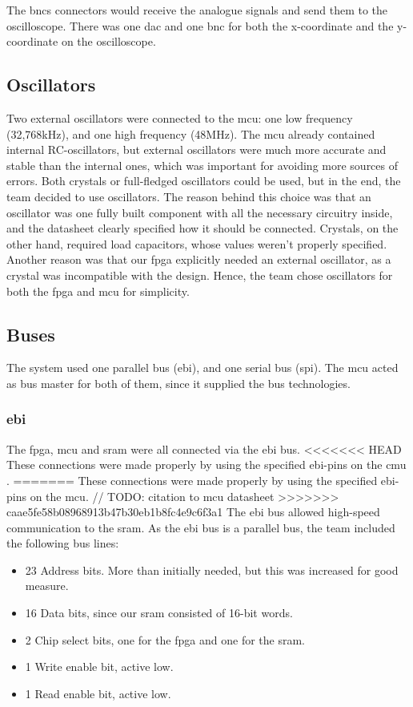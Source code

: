 The \gls{bnc}s connectors would receive the analogue signals and send them to the oscilloscope.
There was one \gls{dac} and one \gls{bnc} for both the x-coordinate and the y-coordinate on the oscilloscope.

\subsection{Oscillators}
Two external oscillators were connected to the \gls{mcu}: one low frequency (32,768kHz), and one high frequency (48MHz).
The \gls{mcu} already contained internal RC-oscillators, but external oscillators were much more accurate and stable than the internal ones, which was important for avoiding more sources of errors.
Both crystals or full-fledged oscillators could be used, but in the end, the team decided to use oscillators.
The reason behind this choice was that an oscillator was one fully built component with all the necessary circuitry inside, and the datasheet clearly specified how it should be connected.
Crystals, on the other hand, required load capacitors, whose values weren't properly specified.
Another reason was that our \gls{fpga} explicitly needed an external oscillator, as a crystal was incompatible with the design.
Hence, the team chose oscillators for both the \gls{fpga} and \gls{mcu} for simplicity.

\subsection{Buses}
The system used one parallel bus (\gls{ebi}), and one serial bus (\gls{spi}).
The \gls{mcu} acted as bus master for both of them, since it supplied the bus technologies.

\subsubsection{\gls{ebi}}
The \gls{fpga}, \gls{mcu} and \gls{sram} were all connected via the \gls{ebi} bus.
<<<<<<< HEAD
These connections were made properly by using the specified \gls{ebi}-pins on the \gls{cmu} \cite{efm32-datasheet}.
=======
These connections were made properly by using the specified \gls{ebi}-pins on the \gls{mcu}. // TODO: citation to \gls{mcu} datasheet
>>>>>>> caae5fe58b08968913b47b30eb1b8fc4e9c6f3a1
The \gls{ebi} bus allowed high-speed communication to the \gls{sram}.
As the \gls{ebi} bus is a parallel bus, the team included the following bus lines:
\begin{itemize}
\item 23 Address bits. More than initially needed, but this was increased for good measure.
\item 16 Data bits, since our \gls{sram} consisted of 16-bit words.
\item 2 Chip select bits, one for the \gls{fpga} and one for the \gls{sram}.
\item 1 Write enable bit, active low.
\item 1 Read enable bit, active low.
\end{itemize}

